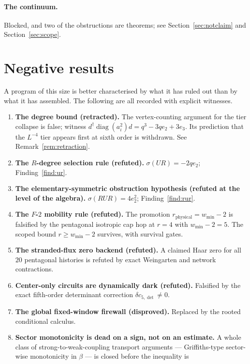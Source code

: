 \documentclass[11pt]{article}
\theoremstyle{definition}
\theoremstyle{remark}
\newcommand{\dg}{^{\dagger}}
\begin{document}
\paragraph{The continuum.} Blocked, and two of the obstructions are theorems;
see Section~\ref{sec:notclaim} and Section~\ref{sec:scope}.

\section{Negative results}\label{sec:negative}

A program of this size is better characterised by what it has ruled out than by
what it has assembled. The following are all recorded with explicit witnesses.

\begin{enumerate}\itemsep3pt
\item \textbf{The degree bound (retracted).} The vertex-counting argument for
  the tier collapse is false; witness
  $d\dg\operatorname{diag}(a_i^2)d=q^3-3qe_2+3e_3$. Its prediction that the
  $L^{-4}$ tier appears first at sixth order is withdrawn. See
  Remark~\ref{rem:retraction}.
\item \textbf{The $R$-degree selection rule (refuted).} $\sigma(UR)=-2qe_2$;
  Finding~\ref{find:ur}.
\item \textbf{The elementary-symmetric obstruction hypothesis (refuted at the
  level of the algebra).} $\sigma(RUR)=4e_2^2$; Finding~\ref{find:rur}.
\item \textbf{The $F$-$2$ mobility rule (refuted).} The promotion
  $r_{\mathrm{physical}}=w_{\min}-2$ is falsified by the pentagonal isotropic
  cap hop at $r=4$ with $w_{\min}-2=5$. The scoped bound
  $r\ge w_{\min}-2$ survives, with survival gates.
\item \textbf{The stranded-flux zero backend (refuted).} A claimed Haar zero
  for all $20$ pentagonal histories is refuted by exact Weingarten and network
  contractions.
\item \textbf{Center-only circuits are dynamically dark (refuted).} Falsified
  by the exact fifth-order determinant correction $\delta c_{5,\det}\ne0$.
\item \textbf{The global fixed-window firewall (disproved).} Replaced by the
  rooted conditional calculus.
\item \textbf{Sector monotonicity is dead on a sign, not on an estimate.} A
  whole class of strong-to-weak-coupling transport arguments --- Griffiths-type
  sector-wise monotonicity in $\beta$ --- is closed before the inequality is

\end{enumerate}
\end{document}
